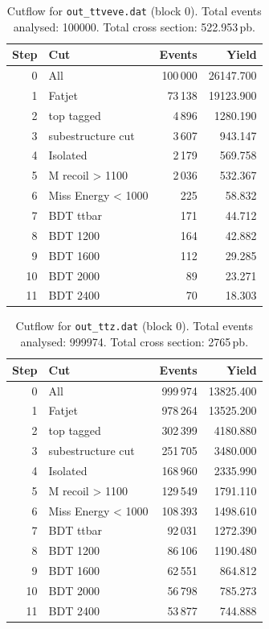\documentclass{article}
\begin{document}
\begin{table}[H]
\centering
\begin{tabular}{r l r r}
\toprule
Step & Cut & Events & Yield \\
\midrule
0 & All & 100\,000 & 26147.700 \\
1 & Fatjet & 73\,138 & 19123.900 \\
2 & top tagged & 4\,896 & 1280.190 \\
3 & subestructure cut & 3\,607 & 943.147 \\
4 & Isolated & 2\,179 & 569.758 \\
5 & M recoil > 1100 & 2\,036 & 532.367 \\
6 & Miss Energy < 1000 & 225 & 58.832 \\
7 & BDT ttbar & 171 & 44.712 \\
8 & BDT 1200 & 164 & 42.882 \\
9 & BDT 1600 & 112 & 29.285 \\
10 & BDT 2000 & 89 & 23.271 \\
11 & BDT 2400 & 70 & 18.303 \\
\bottomrule
\end{tabular}
\caption{Cutflow for \texttt{out\_ttveve.dat} (block 0). Total events analysed: 100000. Total cross section: 522.953\,pb.}
\label{tab:cutflow-out-ttveve-dat}
\end{table}

\begin{table}[H]
\centering
\begin{tabular}{r l r r}
\toprule
Step & Cut & Events & Yield \\
\midrule
0 & All & 999\,974 & 13825.400 \\
1 & Fatjet & 978\,264 & 13525.200 \\
2 & top tagged & 302\,399 & 4180.880 \\
3 & subestructure cut & 251\,705 & 3480.000 \\
4 & Isolated & 168\,960 & 2335.990 \\
5 & M recoil > 1100 & 129\,549 & 1791.110 \\
6 & Miss Energy < 1000 & 108\,393 & 1498.610 \\
7 & BDT ttbar & 92\,031 & 1272.390 \\
8 & BDT 1200 & 86\,106 & 1190.480 \\
9 & BDT 1600 & 62\,551 & 864.812 \\
10 & BDT 2000 & 56\,798 & 785.273 \\
11 & BDT 2400 & 53\,877 & 744.888 \\
\bottomrule
\end{tabular}
\caption{Cutflow for \texttt{out\_ttz.dat} (block 0). Total events analysed: 999974. Total cross section: 2765\,pb.}
\label{tab:cutflow-out-ttz-dat}
\end{table}
\end{document}
